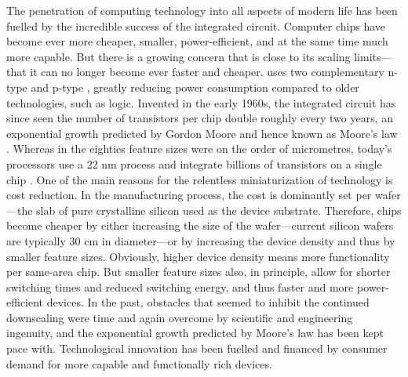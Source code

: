 The penetration of computing technology into all aspects of modern life has been
fuelled by the incredible success of the  integrated circuit.
Computer chips have become ever more cheaper, smaller, power-efficient, and at
the same time much more capable. But there is a growing concern that 
is close to its scaling limits---that it can no longer become ever faster and
cheaper.  uses two complementary n-type and p-type ,
greatly reducing power consumption compared to older technologies, such as
 logic. Invented in the early 1960s, the  integrated
circuit has since seen the number of transistors per chip double roughly every
two years, an exponential growth predicted by Gordon Moore and hence known as
Moore's law \cite{moore1965cramming}. Whereas in the eighties feature sizes were
on the order of micrometres, today's processors use a 22 nm process and
integrate billions of transistors on a single chip \cite{bohr2011evolution}. One
of the main reasons for the relentless miniaturization of  technology
is cost reduction. In the manufacturing process, the cost is dominantly set per
wafer---the slab of pure crystalline silicon used as the device substrate.
Therefore, chips become cheaper by either increasing the size of the
wafer---current silicon wafers are typically 30 cm in diameter---or by
increasing the device density and thus by smaller feature sizes. Obviously,
higher device density means more functionality per same-area chip. But smaller
feature sizes also, in principle, allow for shorter switching times and reduced
switching energy, and thus faster and more power-efficient devices. In the past,
obstacles that seemed to inhibit the continued downscaling were time and again
overcome by scientific and engineering ingenuity, and the exponential growth
predicted by Moore's law has been kept pace with. Technological innovation has
been fuelled and financed by consumer demand for more capable and functionally
rich devices.

